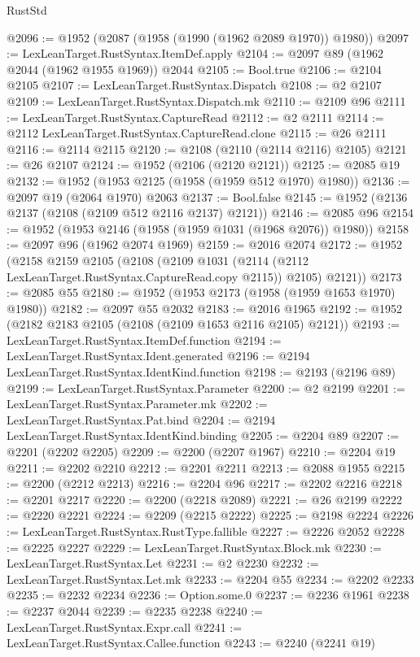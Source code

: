 \begin{lexlean}{RustStd}
\begin{coremodule}
@2096 := @1952 (@2087 (@1958 (@1990 (@1962 @2089 @1970)) @1980))
@2097 := LexLeanTarget.RustSyntax.ItemDef.apply
@2104 := @2097 @89 (@1962 @2044 (@1962 @1955 @1969)) @2044
@2105 := Bool.true
@2106 := @2104 @2105
@2107 := LexLeanTarget.RustSyntax.Dispatch
@2108 := @2 @2107
@2109 := LexLeanTarget.RustSyntax.Dispatch.mk
@2110 := @2109 @96
@2111 := LexLeanTarget.RustSyntax.CaptureRead
@2112 := @2 @2111
@2114 := @2112 LexLeanTarget.RustSyntax.CaptureRead.clone
@2115 := @26 @2111
@2116 := @2114 @2115
@2120 := @2108 (@2110 (@2114 @2116) @2105)
@2121 := @26 @2107
@2124 := @1952 (@2106 (@2120 @2121))
@2125 := @2085 @19
@2132 := @1952 (@1953 @2125 (@1958 (@1959 @512 @1970) @1980))
@2136 := @2097 @19 (@2064 @1970) @2063
@2137 := Bool.false
@2145 := @1952 (@2136 @2137 (@2108 (@2109 @512 @2116 @2137) @2121))
@2146 := @2085 @96
@2154 := @1952 (@1953 @2146 (@1958 (@1959 @1031 (@1968 @2076)) @1980))
@2158 := @2097 @96 (@1962 @2074 @1969)
@2159 := @2016 @2074
@2172 := @1952
    (@2158
      @2159
      @2105
      (@2108
        (@2109 @1031 (@2114 (@2112 LexLeanTarget.RustSyntax.CaptureRead.copy @2115)) @2105)
        @2121))
@2173 := @2085 @55
@2180 := @1952 (@1953 @2173 (@1958 (@1959 @1653 @1970) @1980))
@2182 := @2097 @55 @2032
@2183 := @2016 @1965
@2192 := @1952 (@2182 @2183 @2105 (@2108 (@2109 @1653 @2116 @2105) @2121))
@2193 := LexLeanTarget.RustSyntax.ItemDef.function
@2194 := LexLeanTarget.RustSyntax.Ident.generated
@2196 := @2194 LexLeanTarget.RustSyntax.IdentKind.function
@2198 := @2193 (@2196 @89)
@2199 := LexLeanTarget.RustSyntax.Parameter
@2200 := @2 @2199
@2201 := LexLeanTarget.RustSyntax.Parameter.mk
@2202 := LexLeanTarget.RustSyntax.Pat.bind
@2204 := @2194 LexLeanTarget.RustSyntax.IdentKind.binding
@2205 := @2204 @89
@2207 := @2201 (@2202 @2205)
@2209 := @2200 (@2207 @1967)
@2210 := @2204 @19
@2211 := @2202 @2210
@2212 := @2201 @2211
@2213 := @2088 @1955
@2215 := @2200 (@2212 @2213)
@2216 := @2204 @96
@2217 := @2202 @2216
@2218 := @2201 @2217
@2220 := @2200 (@2218 @2089)
@2221 := @26 @2199
@2222 := @2220 @2221
@2224 := @2209 (@2215 @2222)
@2225 := @2198 @2224
@2226 := LexLeanTarget.RustSyntax.RustType.fallible
@2227 := @2226 @2052
@2228 := @2225 @2227
@2229 := LexLeanTarget.RustSyntax.Block.mk
@2230 := LexLeanTarget.RustSyntax.Let
@2231 := @2 @2230
@2232 := LexLeanTarget.RustSyntax.Let.mk
@2233 := @2204 @55
@2234 := @2202 @2233
@2235 := @2232 @2234
@2236 := Option.some.{0}
@2237 := @2236 @1961
@2238 := @2237 @2044
@2239 := @2235 @2238
@2240 := LexLeanTarget.RustSyntax.Expr.call
@2241 := LexLeanTarget.RustSyntax.Callee.function
@2243 := @2240 (@2241 @19)

\end{coremodule}
\end{lexlean}
